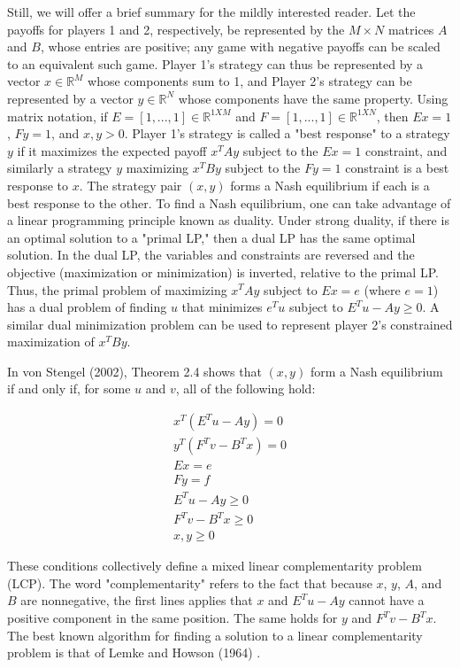 \documentclass{article}
\begin{document}
Still, we will offer a brief summary for the mildly interested reader. Let the payoffs for players 1 and 2, respectively, be represented by the $M \times N$ matrices $A$ and $B$, whose entries are positive; any game with negative payoffs can be scaled to an equivalent such game. Player 1's strategy can thus be represented by a vector $x \in \mathbb{R}^M$ whose components sum to 1, and Player 2's strategy can be represented by a vector $y \in \mathbb{R}^N$ whose components have the same property. Using matrix notation, if $E=[1, ..., 1]\in\mathbb{R}^{1XM}$ and $F=[1, ..., 1]\in\mathbb{R}^{1XN}$, then $Ex=1$, $Fy=1$, and $x,y>0$.  Player 1's strategy is called a "best response" to a strategy $y$ if it maximizes the expected payoff $x^TAy$ subject to the $Ex=1$ constraint, and similarly a strategy $y$ maximizing $x^TBy$ subject to the $Fy=1$ constraint is a best response to $x$. The strategy pair $(x,y)$ forms a Nash equilibrium if each is a best response to the other. To find a Nash equilibrium, one can take advantage of a linear programming principle known as duality. Under strong duality, if there is an optimal solution to a "primal LP," then a dual LP has the same optimal solution. In the dual LP, the variables and constraints are reversed and the objective (maximization or minimization) is inverted, relative to the primal LP. Thus, the primal problem of maximizing $x^TAy$ subject to $Ex=e$ (where $e=1$) has a dual problem of finding $u$ that minimizes $e^Tu$ subject to $E^Tu-Ay \geq 0$. A similar dual minimization problem can be used to represent player 2's constrained maximization of $x^TBy$.

In von Stengel (2002), Theorem 2.4 shows that $(x,y)$ form a Nash equilibrium if and only if, for some $u$ and $v$, all of the following hold:

\begin{align*}
x^T(E^Tu-Ay) = 0 \\
y^T(F^Tv-B^Tx) = 0 \\
Ex = e \\
Fy = f\\
E^T u - A y \geq 0 \\
F^Tv - B^Tx \geq 0 \\
x, y \geq 0
\end{align*}

\noindent These conditions collectively define a mixed linear complementarity problem (LCP). The word "complementarity" refers to the fact that because $x$, $y$, $A$, and $B$ are nonnegative, the first lines applies that $x$ and $E^Tu-Ay$ cannot have a positive component in the same position. The same holds for $y$ and $F^Tv-B^Tx$. The best known algorithm for finding a solution to a linear complementarity problem is that of Lemke and Howson (1964) \cite{lemkehowson}. 
\end{document}
